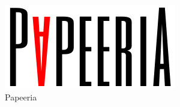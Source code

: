 \documentclass{article}
\begin{document}
\vspace*{\fill} \vspace*{-5ex}
\lipsum[1]
\begin{figure}[tbp]
    \begin{center}
        \includegraphics[scale=0.2]{papeeria}
    \end{center}
    \caption{Papeeria}
\end{figure}
\lipsum[1]
\vspace*{\fill}
\end{document}
